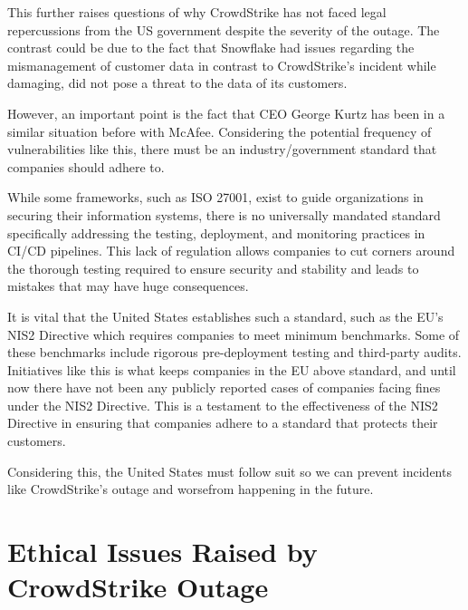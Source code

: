 This further raises questions of why CrowdStrike has not faced legal repercussions from the US government despite the severity of the outage. The contrast could be due to the fact that Snowflake had issues regarding the mismanagement of customer data in contrast to CrowdStrike's incident while damaging, did not pose a threat to the data of its customers.

However, an important point is the fact that CEO George Kurtz has been in a similar situation before with McAfee. Considering the potential frequency of vulnerabilities like this, there must be an industry/government standard that companies should adhere to.

While some frameworks, such as ISO 27001, exist to guide organizations in securing their information systems, there is no universally mandated standard specifically addressing the testing, deployment, and monitoring practices in CI/CD pipelines. This lack of regulation allows companies to cut corners around the thorough testing required to ensure security and stability and leads to mistakes that may have huge consequences.

It is vital that the United States establishes such a standard, such as the EU's NIS2 Directive which requires companies to meet minimum benchmarks. Some of these benchmarks include rigorous pre-deployment testing and third-party audits. \cite{eu_nis2} Initiatives like this is what keeps companies in the EU above standard, and until now there have not been any publicly reported cases of companies facing fines under the NIS2 Directive. This is a testament to the effectiveness of the NIS2 Directive in ensuring that companies adhere to a standard that protects their customers.

Considering this, the United States must follow suit so we can prevent incidents like CrowdStrike's outage and worsefrom happening in the future.

\section{Ethical Issues Raised by CrowdStrike Outage}
